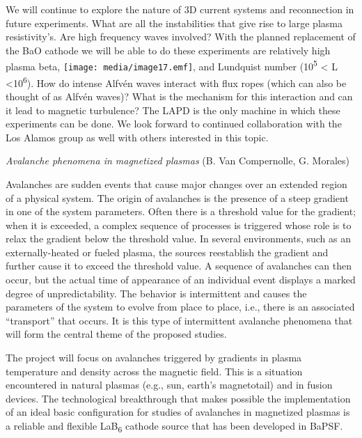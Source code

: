\documentclass[11pt]{article}
\begin{document}
\begin{description}
We will continue to explore the nature of 3D current systems and
reconnection in future experiments. What are all the instabilities that
give rise to large plasma resistivity's. Are high frequency waves
involved? With the planned replacement of the BaO cathode we will be
able to do these experiments are relatively high plasma beta,
\texttt{[image: media/image17.emf]}, and Lundquist number
(10\textsuperscript{5} \textless{} L \textless{}10\textsuperscript{6}).
How do intense Alfvén waves interact with flux ropes (which can also be
thought of as Alfvén waves)? What is the mechanism for this interaction
and can it lead to magnetic turbulence? The LAPD is the only machine in
which these experiments can be done. We look forward to continued
collaboration with the Los Alamos group as well with others interested
in this topic.

\emph{Avalanche phenomena in magnetized plasmas} (B. Van Compernolle, G.
Morales)

Avalanches are sudden events that cause major changes over an extended
region of a physical system. The origin of avalanches is the presence of
a steep gradient in one of the system parameters. Often there is a
threshold value for the gradient; when it is exceeded, a complex
sequence of processes is triggered whose role is to relax the gradient
below the threshold value. In several environments, such as an
externally-heated or fueled plasma, the sources reestablish the gradient
and further cause it to exceed the threshold value. A sequence of
avalanches can then occur, but the actual time of appearance of an
individual event displays a marked degree of unpredictability. The
behavior is intermittent and causes the parameters of the system to
evolve from place to place, i.e., there is an associated ``transport''
that occurs. It is this type of intermittent avalanche phenomena that
will form the central theme of the proposed studies.

The project will focus on avalanches triggered by gradients in plasma
temperature and density across the magnetic field. This is a situation
encountered in natural plasmas (e.g., sun, earth's magnetotail) and in
fusion devices. The technological breakthrough that makes possible the
implementation of an ideal basic configuration for studies of avalanches
in magnetized plasmas is a reliable and flexible LaB\textsubscript{6}
cathode source that has been developed in BaPSF.


\end{description}
\end{document}
